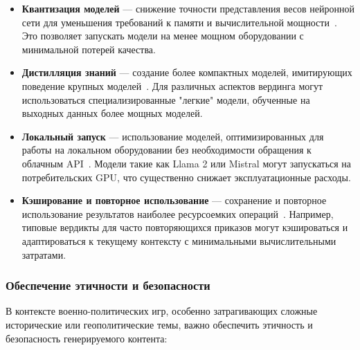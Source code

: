 \begin{itemize}
    \item \textbf{Квантизация моделей} — снижение точности представления весов нейронной сети для уменьшения требований к памяти и вычислительной мощности~\cite{dettmers2022llm}. Это позволяет запускать модели на менее мощном оборудовании с минимальной потерей качества.

    \item \textbf{Дистилляция знаний} — создание более компактных моделей, имитирующих поведение крупных моделей~\cite{hinton2015distilling}. Для различных аспектов вердинга могут использоваться специализированные "легкие" модели, обученные на выходных данных более мощных моделей.

    \item \textbf{Локальный запуск} — использование моделей, оптимизированных для работы на локальном оборудовании без необходимости обращения к облачным API~\cite{touvron2023llama}. Модели такие как Llama 2 или Mistral могут запускаться на потребительских GPU, что существенно снижает эксплуатационные расходы.

    \item \textbf{Кэширование и повторное использование} — сохранение и повторное использование результатов наиболее ресурсоемких операций~\cite{wallace2022automated}. Например, типовые вердикты для часто повторяющихся приказов могут кэшироваться и адаптироваться к текущему контексту с минимальными вычислительными затратами.
\end{itemize}

\subsubsection{Обеспечение этичности и безопасности}

В контексте военно-политических игр, особенно затрагивающих сложные исторические или геополитические темы, важно обеспечить этичность и безопасность генерируемого контента:


